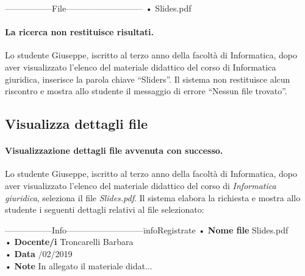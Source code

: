 \begin{tabbing}
	\hspace{1cm}-----------------File---------------------------\kill
	\hspace{1cm} • Slides.pdf  \\
\end{tabbing} 

\paragraph{La ricerca non restituisce risultati.}
Lo studente Giuseppe, iscritto al terzo anno della facoltà di Informatica, dopo aver visualizzato l’elenco del materiale didattico del corso di Informatica giuridica, inserisce la parola chiave “Sliders”. Il sistema non restituisce alcun riscontro e mostra allo studente il messaggio di errore “Nessun file trovato”.

\subsection{ Visualizza dettagli file}
\paragraph{Visualizzazione dettagli file avvenuta con successo.}
Lo studente Giuseppe, iscritto al terzo anno della facoltà di Informatica, dopo aver visualizzato l’elenco del materiale didattico del corso di \textit{Informatica giuridica}, seleziona il file \textit{Slides.pdf}. Il sistema elabora la richiesta e mostra allo studente i seguenti dettagli relativi al file selezionato:

\begin{tabbing}
	\hspace{1cm}-----------------Info---------------------------\= infoRegistrate\kill
	\hspace{1cm} • \textbf{Nome file} \> Slides.pdf  \\
	\hspace{1cm} • \textbf{Docente/i} \> Troncarelli Barbara  \\
	\hspace{1cm} • \textbf{Data} /02/2019  \\
	\hspace{1cm} • \textbf{Note} \> In allegato il materiale didat...  \\
\end{tabbing} 

